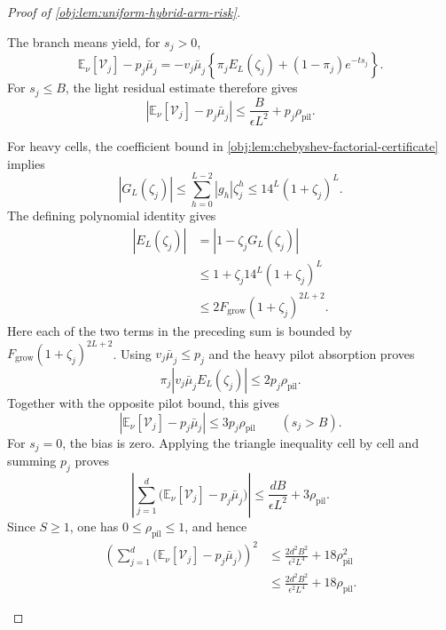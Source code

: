 \documentclass[11pt]{article}
\begin{document}
\begin{proof}[Proof of \cref{obj:lem:uniform-hybrid-arm-risk}]
\begin{enumerate}
The branch means yield, for \(s_j>0\),
\[
\mathbb E_\nu[\mathcal V_j]-p_j\bar\mu_j
=
-v_j\bar\mu_j
\left\{\pi_jE_L(\zeta_j)+(1-\pi_j)e^{-ts_j}\right\}.
\]
For \(s_j\le B\), the light residual estimate therefore gives
\[
\left|\mathbb E_\nu[\mathcal V_j]-p_j\bar\mu_j\right|
\le\frac B{\epsilon L^2}+p_j\rho_{\mathrm{pil}}.
\]

For heavy cells, the coefficient bound in
\cref{obj:lem:chebyshev-factorial-certificate} implies
\[
|G_L(\zeta_j)|
\le
\sum_{h=0}^{L-2}|g_h|\zeta_j^h
\le14^L(1+\zeta_j)^L.
\]
The defining polynomial identity gives
\[
\begin{aligned}
|E_L(\zeta_j)|
&=|1-\zeta_jG_L(\zeta_j)|\\
&\le1+\zeta_j14^L(1+\zeta_j)^L\\
&\le2F_{\mathrm{grow}}(1+\zeta_j)^{2L+2}.
\end{aligned}
\]
Here each of the two terms in the preceding sum is bounded by
\(F_{\mathrm{grow}}(1+\zeta_j)^{2L+2}\).
Using \(v_j\bar\mu_j\le p_j\) and the heavy pilot absorption proves
\[
\pi_j|v_j\bar\mu_jE_L(\zeta_j)|
\le2p_j\rho_{\mathrm{pil}}.
\]
Together with the opposite pilot bound, this gives
\[
\left|\mathbb E_\nu[\mathcal V_j]-p_j\bar\mu_j\right|
\le3p_j\rho_{\mathrm{pil}}
\qquad(s_j>B).
\]
For \(s_j=0\), the bias is zero. Applying the triangle inequality cell by cell and summing \(p_j\) proves
\[
\left|
\sum_{j=1}^d
\bigl(\mathbb E_\nu[\mathcal V_j]-p_j\bar\mu_j\bigr)
\right|
\le\frac{dB}{\epsilon L^2}+3\rho_{\mathrm{pil}}.
\]
Since \(S\ge1\), one has \(0\le\rho_{\mathrm{pil}}\le1\), and hence
\[
\begin{aligned}
\left(
\sum_{j=1}^d
\bigl(\mathbb E_\nu[\mathcal V_j]-p_j\bar\mu_j\bigr)
\right)^2
&\le
\frac{2d^2B^2}{\epsilon^2L^4}
+18\rho_{\mathrm{pil}}^2\\
&\le
\frac{2d^2B^2}{\epsilon^2L^4}
+18\rho_{\mathrm{pil}}.
\end{aligned}
\]


\end{enumerate}
\end{proof}
\end{document}
